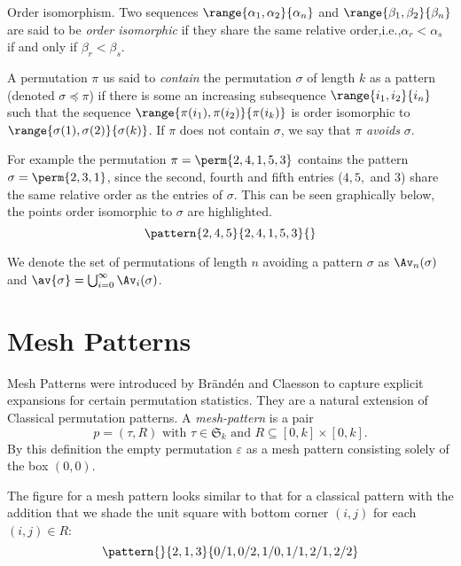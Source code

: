 \begin{definition}{Order isomorphism.}
    Two sequences \(\range{\alpha_1,\alpha_2}{\alpha_n}\) and
    \(\range{\beta_1,\beta_2}{\beta_n}\) are said to be \emph{order isomorphic}
    if they share the same relative order,i.e.,\(\alpha_r<\alpha_s\) if and
    only if \(\beta_r<\beta_s\).
\end{definition}

A permutation \(\pi\) us said to \emph{contain} the permutation \(\sigma\) of
length \(k\) as a pattern (denoted \(\sigma \preceq \pi\)) if there is some
an increasing subsequence \(\range{i_1,i_2}{i_n}\) such that the sequence
\(\range{\pi(i_1),\pi(i_2)}{\pi(i_k)}\) is order isomorphic to
\(\range{\sigma(1),\sigma(2)}{\sigma(k)}\). If \(\pi\) does not contain
\(\sigma\), we say that \(\pi\) \emph{avoids} \(\sigma\).

For example the permutation \(\pi = \perm{2,4,1,5,3}\) contains the pattern
\(\sigma = \perm{2,3,1}\), since the second, fourth and fifth entries
(\(4,5,\) and \(3\)) share the same relative order as the entries of \(\sigma\).
This can be seen graphically below, the points order isomorphic to \(\sigma\)
are highlighted.
\begin{equation*}
    \pattern{2,4,5}{2,4,1,5,3}{}
\end{equation*}

We denote the set of permutations of length \(n\) avoiding a pattern \(\sigma\)
as \(\Av_n(\sigma)\) and \(\av{\sigma} = \bigcup_{i=0}^{\infty}\Av_i(\sigma)\).

\section{Mesh Patterns}
Mesh Patterns were introduced by Brändén and Claesson\cite{journals/combinatorics/BrandenC11} to capture explicit expansions
for certain permutation statistics. They are a natural extension of Classical
permutation patterns. A \emph{mesh-pattern} is a pair
\begin{equation*}
    p = (\tau,R)\text{ with } \tau \in \mathfrak{S}_k \text{ and } R \subseteq
    [0,k]\times [0,k].
\end{equation*}
By this definition the empty permutation \(\varepsilon\) as a mesh pattern consisting solely of the
box \((0,0)\).

The figure for a mesh pattern looks similar to that for a classical pattern with the
addition that we shade the unit square with bottom corner \((i,j)\) for each \((i,j) \in R\):
\begin{equation*}
    \pattern{}{ 2, 1, 3 }{ 0/1, 0/2, 1/0, 1/1, 2/1, 2/2 }
\end{equation*}

